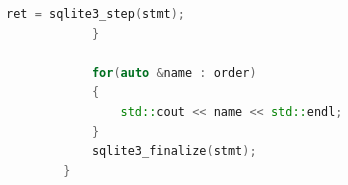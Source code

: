 \documentclass [11pt,a4paper,dvipdfmx] {jarticle}
\begin{document}
\begin{lstlisting}[language=C++]
                ret = sqlite3_step(stmt);                                                                                                                                                                                                                                                 
            }                                                                                                                                                                                                                                                                           
                                                                                                                                                                                                                                                                                      
            for(auto &name : order)                                                                                                                                                                                                                                                     
            {                                                                                                                                                                                                                                                                           
                std::cout << name << std::endl;                                                                                                                                                                                                                                           
            }                                                                                                                                                                                                                                                                           
            sqlite3_finalize(stmt);                                                                                                                                                                                                                                                     
        }                                                                                                                                                                                                                                                                             
                                                                                                                                                                                                                                                                                      

\end{lstlisting}
\end{document}
